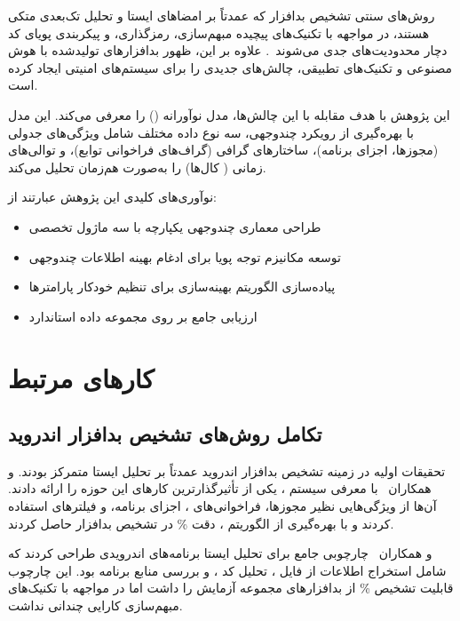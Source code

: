\documentclass[a4paper,11pt]{article}
\begin{document}
روش‌های سنتی تشخیص بدافزار که عمدتاً بر امضاهای ایستا و تحلیل تک‌بعدی متکی هستند، در مواجهه با تکنیک‌های پیچیده مبهم‌سازی، رمزگذاری، و پیکربندی پویای کد دچار محدودیت‌های جدی می‌شوند~\cite{SignatureBasedLimitations}. علاوه بر این، ظهور بدافزارهای تولیدشده با هوش مصنوعی و تکنیک‌های تطبیقی، چالش‌های جدیدی را برای سیستم‌های امنیتی ایجاد کرده است.

این پژوهش با هدف مقابله با این چالش‌ها، مدل نوآورانه  () را معرفی می‌کند. این مدل با بهره‌گیری از رویکرد چندوجهی، سه نوع داده مختلف شامل ویژگی‌های جدولی (مجوزها، اجزای برنامه)، ساختارهای گرافی (گراف‌های فراخوانی توابع)، و توالی‌های زمانی ( کال‌ها) را به‌صورت هم‌زمان تحلیل می‌کند.

نوآوری‌های کلیدی این پژوهش عبارتند از:
\begin{itemize}
  \item طراحی معماری چندوجهی یکپارچه با سه ماژول تخصصی
  \item توسعه مکانیزم توجه پویا برای ادغام بهینه اطلاعات چندوجهی
  \item پیاده‌سازی الگوریتم بهینه‌سازی  برای تنظیم خودکار پارامترها
  \item ارزیابی جامع بر روی مجموعه داده استاندارد 
\end{itemize}

\section{کارهای مرتبط}
\subsection{تکامل روش‌های تشخیص بدافزار اندروید}
تحقیقات اولیه در زمینه تشخیص بدافزار اندروید عمدتاً بر تحلیل ایستا متمرکز بودند.  و همکاران~\cite{DrebinPaper} با معرفی سیستم ، یکی از تأثیرگذارترین کارهای این حوزه را ارائه دادند. آن‌ها از ویژگی‌هایی نظیر مجوزها، فراخوانی‌های ، اجزای برنامه، و فیلترهای  استفاده کردند و با بهره‌گیری از الگوریتم ، دقت \% در تشخیص بدافزار حاصل کردند.

 و همکاران~\cite{StaticAnalysisFramework} چارچوبی جامع برای تحلیل ایستا برنامه‌های اندرویدی طراحی کردند که شامل استخراج اطلاعات از فایل ، تحلیل کد ، و بررسی منابع برنامه بود. این چارچوب قابلیت تشخیص \% از بدافزارهای مجموعه آزمایش را داشت اما در مواجهه با تکنیک‌های مبهم‌سازی کارایی چندانی نداشت.
\end{document}
